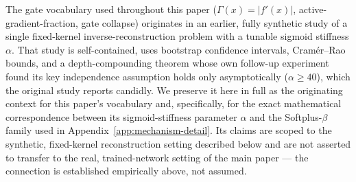 The gate vocabulary used throughout this paper ($\Gamma(x)=|f'(x)|$,
active-gradient-fraction, gate collapse) originates in an earlier,
fully synthetic study of a single fixed-kernel inverse-reconstruction
problem with a tunable sigmoid stiffness $\alpha$. That study is
self-contained, uses bootstrap confidence intervals, Cram\'er--Rao bounds,
and a depth-compounding theorem whose own follow-up experiment found its
key independence assumption holds only asymptotically ($\alpha\geq40$),
which the original study reports candidly. We preserve it here in full as
the originating context for this paper's vocabulary and, specifically,
for the exact mathematical correspondence between its sigmoid-stiffness
parameter $\alpha$ and the Softplus-$\beta$ family used in
Appendix~\ref{app:mechanism-detail}. Its claims are scoped to the
synthetic, fixed-kernel reconstruction setting described below and are not
asserted to transfer to the real, trained-network setting of the main
paper --- the connection is established empirically above, not assumed.


